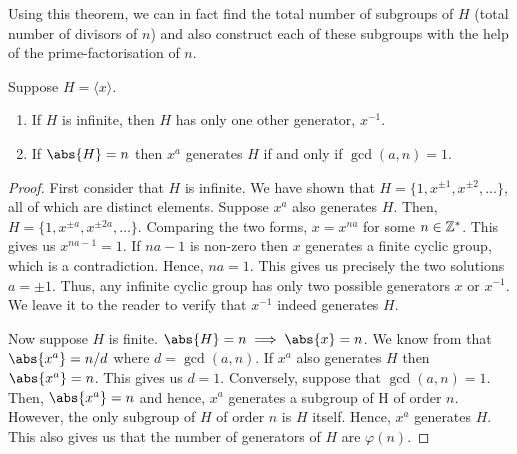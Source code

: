 Using this theorem, we can in fact find the total number of subgroups of $H$ (total number of divisors of $n$) and also construct each of these subgroups with the help of the prime-factorisation of $n$.

\begin{prop} \label{prop:cyclic-generators}
    Suppose $H = \langle x \rangle$. 
    \begin{enumerate}
        \item If $H$ is infinite, then $H$ has only one other generator, $x^{-1}$.
        \item If $\abs{H} = n$ then $x^a$ generates $H$ if and only if $\gcd(a,n) = 1$.
    \end{enumerate}
\end{prop}
\begin{proof}
First consider that $H$ is infinite. We have shown that $H = \{1, x^{\pm 1}, x^{\pm 2}, \ldots \}$, all of which are distinct elements. Suppose $x^a$ also generates $H$. Then, $H = \{ 1, x^{\pm a}, x^{\pm 2a}, \ldots \}$. Comparing the two forms, $x = x^{na}$ for some $n \in \mathbb{Z}^{\ast}$. This gives us $x^{na - 1} = 1$. If $na - 1$ is non-zero then $x$ generates a finite cyclic group, which is a contradiction. Hence, $na = 1$. This gives us precisely the two solutions $a = \pm 1$. Thus, any infinite cyclic group has only two possible generators $x$ or $x^{-1}$. We leave it to the reader to verify that $x^{-1}$ indeed generates $H$.

\medskip

Now suppose $H$ is finite. $\abs{H} = n \implies \abs{x} = n$. We know from  that $\abs{x^a} = n/d$ where $d = \gcd(a,n)$. If $x^a$ also generates $H$ then $\abs{x^a} = n$. This gives us $d = 1$. Conversely, suppose that $\gcd(a,n) = 1$. Then, $\abs{x^a} = n$ and hence, $x^a$ generates a subgroup of H of order $n$. However, the only subgroup of $H$ of order $n$ is $H$ itself. Hence, $x^a$ generates $H$. This also gives us that the number of generators of $H$ are $\varphi(n)$.
\end{proof}

